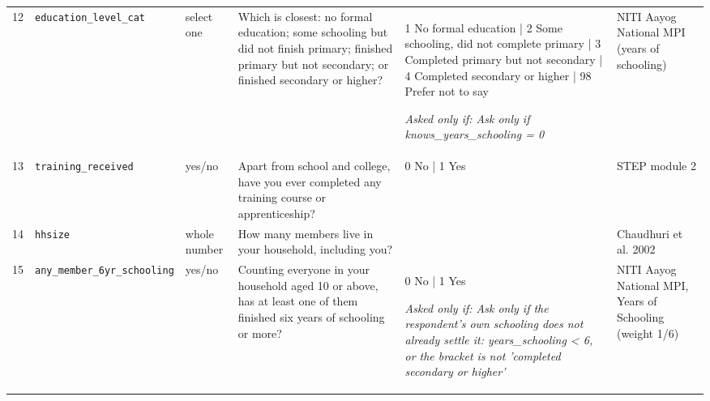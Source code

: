\documentclass[9pt,a4paper,landscape]{article}
\begin{document}
\begin{longtable}{@{}p{0.5cm}p{3.3cm}p{1.7cm}p{7.3cm}p{5.6cm}p{5.4cm}@{}}
\footnotesize 12 & \footnotesize\texttt{education\_level\_cat} & \scriptsize select one & \footnotesize Which is closest: no formal education; some schooling but did not finish primary; finished primary but not secondary; or finished secondary or higher?\par\vspace{1pt}{\footnotesize\color{hdr}{\hifont इनमें से कौन सा सबसे नज़दीक है: बिल्कुल नहीं पढ़े; थोड़ा पढ़े पर प्राइमरी पूरी नहीं की; प्राइमरी पूरी की पर दसवीं नहीं; या दसवीं या उससे ज़्यादा?}} & \scriptsize 1 No formal education | 2 Some schooling, did not complete primary | 3 Completed primary but not secondary | 4 Completed secondary or higher | 98 Prefer not to say\par\vspace{1pt}\textit{Asked only if: Ask only if knows\_years\_schooling = 0} & \scriptsize NITI Aayog National MPI (years of schooling)\\
\footnotesize 13 & \footnotesize\texttt{training\_received} & \scriptsize yes/no & \footnotesize Apart from school and college, have you ever completed any training course or apprenticeship?\par\vspace{1pt}{\footnotesize\color{hdr}{\hifont स्कूल और कॉलेज की पढ़ाई छोड़कर, क्या आपने कभी कोई ट्रेनिंग या सीखने का कोर्स पूरा किया है?}} & \scriptsize 0 No | 1 Yes & \scriptsize STEP module 2\\
\footnotesize 14 & \footnotesize\texttt{hhsize} & \scriptsize whole number & \footnotesize How many members live in your household, including you?\par\vspace{1pt}{\footnotesize\color{hdr}{\hifont आपके घर में आपको मिलाकर कुल कितने लोग रहते हैं?}} & \scriptsize  & \scriptsize Chaudhuri et al. 2002\\
\footnotesize 15 & \footnotesize\texttt{any\_member\_6yr\_schooling} & \scriptsize yes/no & \footnotesize Counting everyone in your household aged 10 or above, has at least one of them finished six years of schooling or more?\par\vspace{1pt}{\footnotesize\color{hdr}{\hifont आपके घर में 10 साल या उससे बड़े सभी लोगों में से, क्या कम से कम एक ने छह साल या उससे ज़्यादा पढ़ाई पूरी की है?}} & \scriptsize 0 No | 1 Yes\par\vspace{1pt}\textit{Asked only if: Ask only if the respondent's own schooling does not already settle it: years\_schooling < 6, or the bracket is not 'completed secondary or higher'} & \scriptsize NITI Aayog National MPI, Years of Schooling (weight 1/6)\\

\end{longtable}
\end{document}
